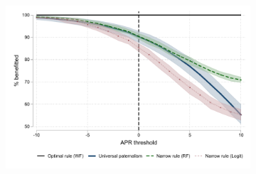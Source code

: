 \begin{figure}
    \caption{Targeting rules}
    \label{targeting_rules}
    \begin{center}
    \begin{subfigure}{0.6\textwidth}
        \centering
        \includegraphics[width=\textwidth]{Figuras/wide_narrow_rule.pdf}
    \end{subfigure}
    \end{center}
      

\end{figure}
